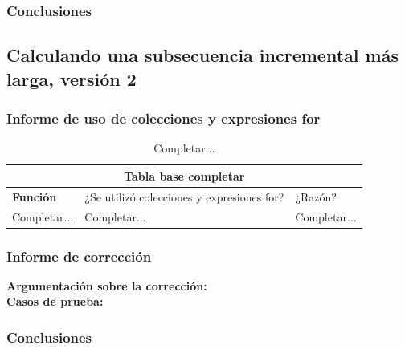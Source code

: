 \documentclass[12pt, a4paper]{article}
\begin{document}
\subsubsection{Conclusiones}
\subsection{Calculando una subsecuencia incremental más larga, versión 2}
\subsubsection{Informe de uso de colecciones y expresiones for}
\begin{table}[H]
    \scriptsize
   \begin{tabular}{ |p{4cm}|p{3cm}|p{5.5cm}|  }
    \hline
    \multicolumn{3}{|c|}{Tabla base completar} \\
    \hline
    \textbf{Función}& ¿Se utilizó colecciones y expresiones for?  & ¿Razón?\\
    \hline
     Completar... & Completar... &  Completar... \\
     \hline
   \end{tabular}
   \centering
   \caption{Completar...}
   \end{table}
\subsubsection{Informe de corrección}
\textbf{Argumentación sobre la corrección: \\}
\textbf{Casos de prueba: \\}
\subsubsection{Conclusiones}
\end{document}
